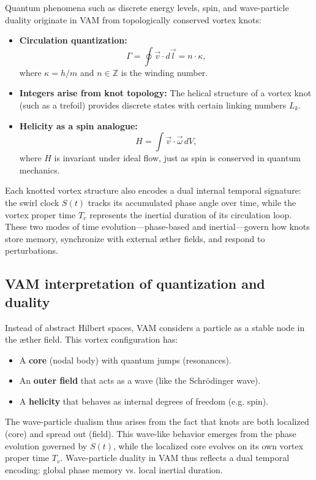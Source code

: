 Quantum phenomena such as discrete energy levels, spin, and wave-particle duality originate in VAM from topologically conserved vortex knots:

\begin{itemize}
    \item \textbf{Circulation quantization:}
    \begin{equation}
        \Gamma = \oint \vec{v} \cdot d\vec{l} = n \cdot \kappa,
    \end{equation}
    where $\kappa = h/m$ and $n \in \mathbb{Z}$ is the winding number.
    \item \textbf{Integers arise from knot topology:} The helical structure of a vortex knot (such as a trefoil) provides discrete states with certain linking numbers $L_k$.
    \item \textbf{Helicity as a spin analogue:}
    \begin{equation}
        H = \int \vec{v} \cdot \vec{\omega} \, dV,
    \end{equation}
    where $H$ is invariant under ideal flow, just as spin is conserved in quantum mechanics.
\end{itemize}
\noindent
Each knotted vortex structure also encodes a dual internal temporal signature: the swirl clock $S(t)$ tracks its accumulated phase angle over time, while the vortex proper time $T_v$ represents the inertial duration of its circulation loop. These two modes of time evolution—phase-based and inertial—govern how knots store memory, synchronize with external æther fields, and respond to perturbations.

\subsection{VAM interpretation of quantization and duality}

Instead of abstract Hilbert spaces, VAM considers a particle as a stable node in the æther field. This vortex configuration has:

\begin{itemize}
    \item A \textbf{core} (nodal body) with quantum jumps (resonances).
    \item An \textbf{outer field} that acts as a wave (like the Schrödinger wave).
    \item A \textbf{helicity} that behaves as internal degrees of freedom (e.g. spin).
\end{itemize}
The wave-particle dualism thus arises from the fact that knots are both localized (core) and spread out (field).
This wave-like behavior emerges from the phase evolution governed by $S(t)$, while the localized core evolves on its own vortex proper time $T_v$. Wave-particle duality in VAM thus reflects a dual temporal encoding: global phase memory vs. local inertial duration.


